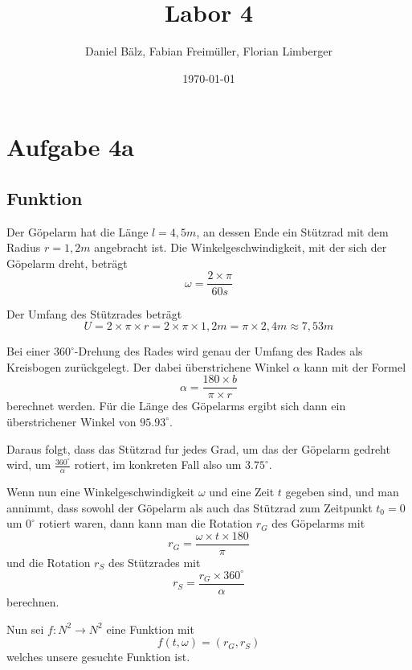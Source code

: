 \documentclass[a4paper,12pt]{article}
\begin{document}
\title{Labor 4}
\author{Daniel Bälz, Fabian Freimüller, Florian Limberger}
\date{\today}

\maketitle

\section{Aufgabe 4a}
\subsection{Funktion}

Der Göpelarm hat die Länge $l=4,5m$, an dessen Ende ein Stützrad mit dem Radius $r=1,2m$ angebracht ist. Die Winkelgeschwindigkeit, mit der sich der Göpelarm dreht, beträgt
$$\omega = \frac{2 \times \pi}{60s}$$

Der Umfang des Stützrades beträgt
$$U = 2 \times \pi \times r = 2 \times \pi \times 1,2m = \pi \times 2,4m \approx 7,53m$$

Bei einer $360^{\circ}$-Drehung des Rades wird genau der Umfang des Rades als Kreisbogen zurückgelegt. Der dabei überstrichene Winkel $\alpha$ kann mit der Formel
$$\alpha = \frac{180 \times b}{\pi \times r}$$
berechnet werden. Für die Länge des Göpelarms ergibt sich dann ein überstrichener Winkel von $95.93^{\circ}$.

Daraus folgt, dass das Stützrad fur jedes Grad, um das der Göpelarm gedreht wird, um $\frac{360^{\circ}}{\alpha}$ rotiert, im konkreten Fall also um $3.75^{\circ}$.

Wenn nun eine Winkelgeschwindigkeit $\omega$ und eine Zeit $t$ gegeben sind, und man annimmt, dass sowohl der Göpelarm als auch das Stützrad zum Zeitpunkt $t_{0} = 0$ um $0^{\circ}$ rotiert waren, dann kann man die Rotation $r_{G}$ des Göpelarms mit
$$r_{G} = \frac{\omega \times t \times 180}{\pi}$$
und die Rotation $r_{S}$ des Stützrades mit
$$r_{S} = \frac{r_{G} \times 360^{\circ}}{\alpha}$$
berechnen.

Nun sei $f: N^2 \rightarrow N^2$ eine Funktion mit
$$f(t, \omega) = (r_{G}, r_{S})$$
welches unsere gesuchte Funktion ist.
\end{document}
